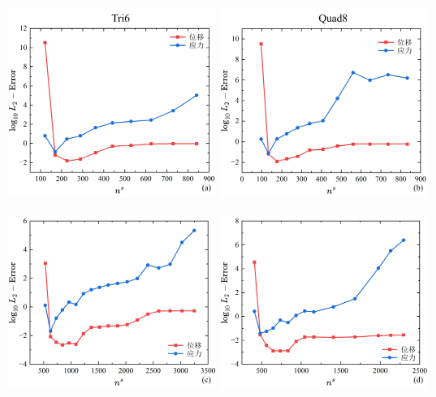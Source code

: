\begin{figure}[!h]
    \centering
    \begin{subcaptiongroup}
    \includegraphics[width=0.49\textwidth]{figures/shearlocking/T6-l2-ns8.png}
    \label{T6-l2-ns8}
    \includegraphics[width=0.49\textwidth]{figures/shearlocking/Q8-l2-ns8.png}
    \label{Q8-l2-ns8}
    \end{subcaptiongroup}
    \begin{subcaptiongroup}
    \includegraphics[width=0.49\textwidth]{figures/shearlocking/T6-l2-ns16.png}
    \label{T6-l2-ns16}
    \includegraphics[width=0.49\textwidth]{figures/shearlocking/Q8-l2-ns16.png}

\end{subcaptiongroup}
\end{figure}
